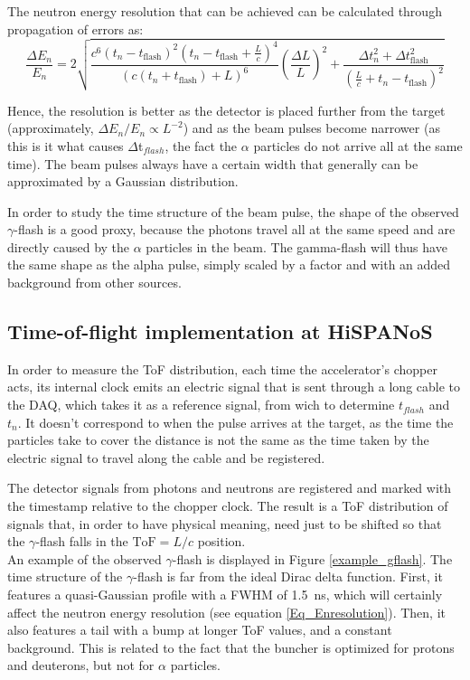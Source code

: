 \documentclass[a4paper,12pt]{report}
\begin{document}
The neutron energy resolution that can be achieved can be calculated through propagation of errors as:
\begin{equation}
    \frac{\Delta E_n}{E_n} =
    2\sqrt{\frac{c^6\left(t_n-t_\text{flash}\right)^2\left(t_n-t_\text{flash}+\frac{L}{c}\right)^4}{\left(c\left(t_n+t_\text{flash}\right)+L\right)^6}\left(\frac{\Delta L}{L}\right)^2 + \frac{\Delta t_n^2 + \Delta t_\text{flash}^2}{{\left(\frac{L}{c}+t_n-t_\text{flash}\right)}^2}}
    \label{Eq_Enresolution}
\end{equation}

Hence, the resolution is better as the detector is placed further from the target (approximately, $\Delta E_n/E_n \propto L^{-2}$) and as the beam pulses become narrower (as this is it what causes  $\Delta$t$_{flash}$, the fact the $\alpha$ particles do not arrive all at the same time).
The beam pulses always have a certain width that generally can be approximated by a Gaussian distribution.

In order to study the time structure of the beam pulse, the shape of the observed $\gamma$-flash is a good proxy, because the photons travel all at the same speed and are directly caused by the $\alpha$ particles in the beam.
The gamma-flash will thus have the same shape as the alpha pulse, simply scaled by a factor and with an added background from other sources.

\subsection{Time-of-flight implementation at HiSPANoS} 
In order to measure the ToF distribution, each time the accelerator's chopper acts, its internal clock emits an electric signal that is sent through a long cable to the DAQ, which takes it as a reference signal, from wich to determine $t_{flash}$ and $t_n$.
It doesn't correspond to when the pulse arrives at the target, as the time the particles take to cover the distance is not the same as the time taken by the electric signal to travel along the cable and be registered.

The detector signals from photons and neutrons are registered and marked with the timestamp relative to the chopper clock.
The result is a ToF distribution of signals that, in order to have physical meaning, need just to be shifted so that the $\gamma$-flash falls in the $\text{ToF}=L/c$ position.
\\

An example of the observed $\gamma$-flash is displayed in Figure \ref{example_gflash}.	%
The time structure of the $\gamma$-flash is far from the ideal Dirac delta function.
First, it features a quasi-Gaussian profile with a FWHM of \qty{1.5}{\nano\second}, which will certainly affect the neutron energy resolution (see equation \ref{Eq_Enresolution}).
Then, it also features a tail with a bump at longer ToF values, and a constant background.
This is related to the fact that the buncher is optimized for protons and deuterons, but not for $\alpha$ particles.
\end{document}
